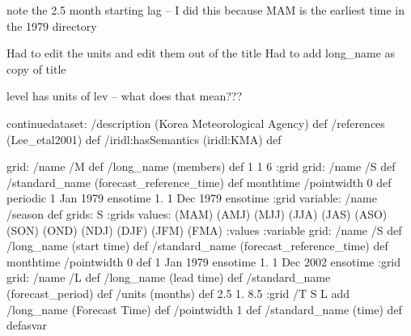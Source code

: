 note the 2.5 month starting lag -- I did this because MAM is the earliest time
in the 1979 directory

Had to edit the units and edit them out of the title
Had to add long_name as copy of title

level has units of lev -- what does that mean???

\begin{ingrid}
continuedataset:
/description (Korea Meteorological Agency) def
/references (Lee_etal2001) def
/iridl:hasSemantics (iridl:KMA) def

grid:
/name /M def
/long_name (members) def
1 1 6
:grid
grid:
/name /S def
/standard_name (forecast_reference_time) def
monthtime
/pointwidth 0 def
periodic
1 Jan 1979 ensotime
1.
1 Dec 1979 ensotime
:grid
variable:
/name /season def
grids: S :grids
values:
(MAM)
(AMJ)
(MJJ)
(JJA)
(JAS)
(ASO)
(SON)
(OND)
(NDJ)
(DJF)
(JFM)
(FMA)
:values
:variable
grid:
/name /S def
/long_name (start time) def
/standard_name (forecast_reference_time) def
monthtime
/pointwidth 0 def
1 Jan 1979 ensotime
1.
1 Dec 2002 ensotime
:grid
grid:
/name /L def
/long_name (lead time) def
/standard_name (forecast_period) def
/units (months) def
2.5 1. 8.5
:grid
/T { S L add /long_name (Forecast Time) def /pointwidth 1 def
/standard_name (time) def
} defasvar
\end{ingrid}

